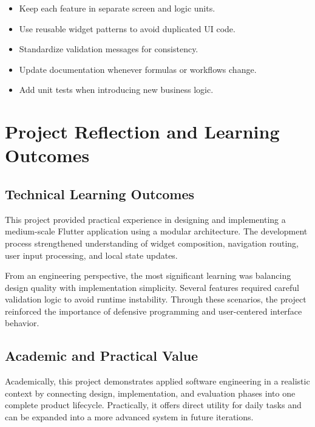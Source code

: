 \documentclass{article}
\begin{document}
\begin{insightbox}
\begin{itemize}
\item Keep each feature in separate screen and logic units.
\item Use reusable widget patterns to avoid duplicated UI code.
\item Standardize validation messages for consistency.
\item Update documentation whenever formulas or workflows change.
\item Add unit tests when introducing new business logic.
\end{itemize}
\end{insightbox}

\newpage
\section{Project Reflection and Learning Outcomes}

\subsection{Technical Learning Outcomes}
This project provided practical experience in designing and implementing a medium-scale Flutter application using a modular architecture. The development process strengthened understanding of widget composition, navigation routing, user input processing, and local state updates.

From an engineering perspective, the most significant learning was balancing design quality with implementation simplicity. Several features required careful validation logic to avoid runtime instability. Through these scenarios, the project reinforced the importance of defensive programming and user-centered interface behavior.

\subsection{Academic and Practical Value}
Academically, this project demonstrates applied software engineering in a realistic context by connecting design, implementation, and evaluation phases into one complete product lifecycle. Practically, it offers direct utility for daily tasks and can be expanded into a more advanced system in future iterations.
\end{document}
